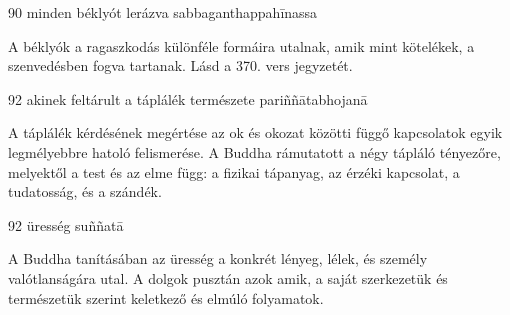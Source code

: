
\begin{notesdescription}

\item[{90}
{minden béklyót lerázva}
{sabbaganthappahīnassa}] \hfill\par

A béklyók a ragaszkodás különféle formáira utalnak, amik mint kötelékek, a szenvedésben fogva tartanak. Lásd a 370. vers jegyzetét.

\item[{92}
{akinek feltárult a táplálék természete}
{pariññātabhojanā}] \hfill\par

A táplálék kérdésének megértése az ok és okozat közötti függő kapcsolatok egyik legmélyebbre hatoló felismerése. A Buddha rámutatott a négy tápláló tényezőre, melyektől a test és az elme függ: a fizikai tápanyag, az érzéki kapcsolat, a tudatosság, és a szándék.

\item[{92}
{üresség}
{suññatā}] \hfill\par

A Buddha tanításában az üresség a konkrét lényeg, lélek, és személy valótlanságára utal. A dolgok pusztán azok amik, a saját szerkezetük és természetük szerint keletkező és elmúló folyamatok.

\end{notesdescription}

